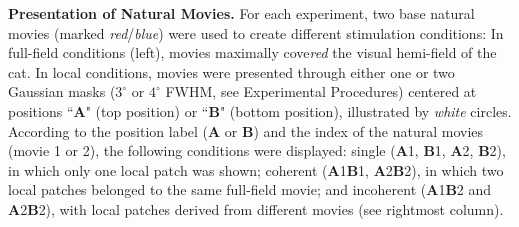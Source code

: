 \textbf{Presentation of Natural Movies.} For each experiment, two base
natural movies (marked \textit{red}/\textit{blue}) were used to create different stimulation
conditions: In full-field conditions (left), movies maximally cove\textit{red} the
visual hemi-field of the cat. In local conditions, movies were presented
through either one or two Gaussian masks ($3^\circ$ or $4^\circ$ FWHM, see
Experimental Procedures) centered at positions ``\textbf{A}" (top position)
or ``\textbf{B}" (bottom position), illustrated by \textit{white} circles.
According to the position label (\textbf{A} or \textbf{B}) and the index of
the natural movies (movie 1 or 2), the following conditions were displayed:
single (\textbf{A}1, \textbf{B}1, \textbf{A}2, \textbf{B}2), in which only
one local patch was shown; coherent (\textbf{A}1\textbf{B}1,
\textbf{A}2\textbf{B}2), in which two local patches belonged to the same
full-field movie; and incoherent (\textbf{A}1\textbf{B}2 and
\textbf{A}2\textbf{B}2), with local patches derived from different movies
(see rightmost column).
